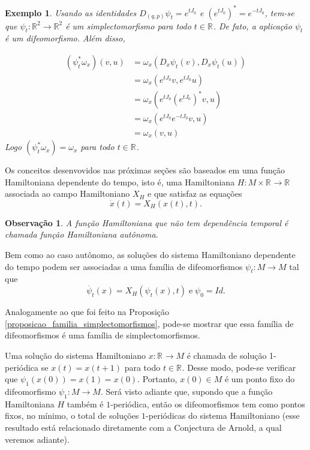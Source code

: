 \documentclass[12pt]{book}
\newtheorem{exemplo}[teorema]{Exemplo}
\newtheorem{observacao}[teorema]{Observação}
\newcommand{\campohamiltoniano}[1]{X_{H}(#1)}
\newcommand{\campohamiltonianoabrev}{X_{H}}
\newcommand{\estruturacomplexa}{J_{0}}
\newcommand{\real}[1]{\mathbb{R}^{#1}}
\newcommand{\reta}{\real{}}
\begin{document}
\begin{exemplo}
		Usando as identidades $D_{(q,p)}\psi_{t} = e^{t\estruturacomplexa}$ e $(e^{t\estruturacomplexa})^{*} = e^{-t\estruturacomplexa}$, tem-se que $\psi_{t}:\real{2}\to \real{2}$ é um simplectomorfismo para todo $t\in \reta$. De fato, a aplicação $\psi_{t}$ é um difeomorfismo. Além disso,
		
		$$
		\begin{aligned}
		(\psi^{*}_{t}\omega_{x})(v,u)
		&=\omega_{x}(D_{x}\psi_{t}(v), D_{x}\psi_{t}(u))
		\\
		&=\omega_{x}(e^{t\estruturacomplexa}v,e^{t\estruturacomplexa}u)
		\\
		&=\omega_{x}(e^{t\estruturacomplexa}(e^{t\estruturacomplexa})^{*}v,u)
		\\
		&=\omega_{x}(e^{t\estruturacomplexa}e^{-t\estruturacomplexa}v,u)
		\\
		&=\omega_{x}(v,u)
		\end{aligned}
		$$
		Logo $	(\psi^{*}_{t}\omega_{x}) = \omega_{x}$ para todo $t\in \reta$.
	\end{exemplo}
	
	Os conceitos desenvovidos nas próximas seções são baseados em uma função Hamiltoniana dependente do tempo, isto é, uma Hamiltoniana $H:M\times \reta\to \reta$ associada ao campo Hamiltoniano $\campohamiltonianoabrev$ e que satisfaz as equações
	$$
	\dot{x}(t) = \campohamiltoniano{x(t),t}.
	$$
	
	\begin{observacao}
		A função Hamiltoniana que não tem dependência temporal 	é chamada função Hamiltoniana autônoma.
	\end{observacao}
	
	Bem como ao caso autônomo, as soluções do sistema Hamiltoniano dependente do tempo podem ser associadas a uma família de difeomorfismos $\psi_{t}:M \to M$ tal que
	$$
	\dot{\psi_{t}}(x) = \campohamiltoniano{\psi_{t}(x), t}\; \text{e} \; \psi_{0}=Id. 
	$$ 
	
	Analogamente ao que foi feito na Proposição \ref{proposicao_familia_simplectomorfismos}, pode-se mostrar que essa família de difeomorfismos é uma família de simplectomorfismos.
	
	Uma solução do sistema Hamiltoniano $x:\reta\to M$ é chamada de solução 1-periódica se $x(t) = x(t+1)$ para todo $t\in \reta$. Desse modo, pode-se verificar que $\psi_{1}(x(0)) = x(1) = x(0)$. Portanto, $x(0)\in M$ é um ponto fixo do difeomorfismo $\psi_{1}:M\to M$. Será visto adiante que, supondo que a função Hamiltoniana $H$ também é $1$-periódica, então os difeomorfismos tem como pontos fixos, no mínimo, o total de soluções $1$-periódicas do sistema Hamiltoniano (esse resultado está relacionado diretamente com a Conjectura de Arnold, a qual veremos adiante).
	
\end{document}
